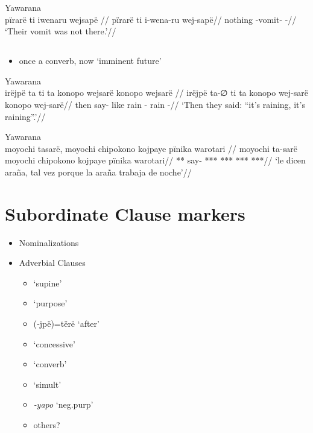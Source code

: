 \documentclass{memoir}
\begin{document}
\ex Yawarana \\
\label{ctorat-19}    \begingl
    \glpreamble  pïrarë ti iwenaru wejsapë //
    \gla pïrarë ti i-wena-ru wej-sapë//
    \glb nothing  -vomit- -//
        \glft ‘Their vomit was not there.’//  
    \endgl 
\xe

\subsection{\texorpdfstring{}{}}

\begin{itemize}
\tightlist
\item
  once a converb, now `imminent future'
\end{itemize}

\ex Yawarana \\
\label{ctorat-25}    \begingl
    \glpreamble  irëjpë ta ti ta konopo wejsarë konopo wejsarë //
    \gla irëjpë ta-∅ ti ta konopo wej-sarë konopo wej-sarë//
    \glb then say-  like rain - rain -//
        \glft ‘Then they said: “it’s raining, it’s raining”.’//  
    \endgl 
\xe

\ex Yawarana \\
\label{ctoaragrme-25}    \begingl
    \glpreamble  moyochi tasarë, moyochi chipokono kojpaye pïnika warotari //
    \gla moyochi ta-sarë moyochi chipokono kojpaye pïnika warotari//
    \glb *** say- *** *** ***  ***//
        \glft ‘le dicen araña, tal vez porque la araña trabaja de noche’//  
    \endgl 
\xe

\section{Subordinate Clause markers}

\begin{itemize}
\tightlist
\item
  Nominalizations
\item
  Adverbial Clauses

  \begin{itemize}
  \tightlist
  \item
     `supine'
  \item
     `purpose'
  \item
    (‑jpë)=tërë `after'
  \item
     `concessive'
  \item
     `converb'
  \item
     `simult'
  \item
    \emph{‑yapo} `neg.purp'
  \item
    others?
  \end{itemize}
\end{itemize}
\end{document}
